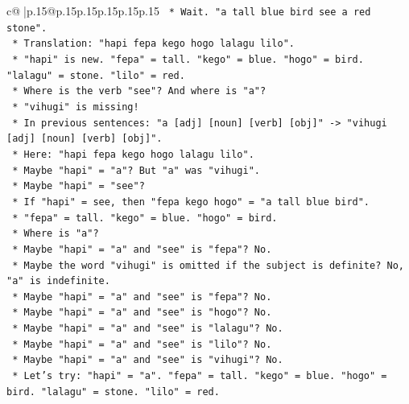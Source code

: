 \documentclass{article}
\begin{document}
{\begin{supertabular}{c@{$\;$}|p{.15\linewidth}@{}p{.15\linewidth}p{.15\linewidth}p{.15\linewidth}p{.15\linewidth}p{.15\linewidth}}
{{{\texttt{                        *   Wait. "a tall blue bird see a red stone".} \\
\texttt{                        *   Translation: "hapi fepa kego hogo lalagu lilo".} \\
\texttt{                        *   "hapi" is new. "fepa" = tall. "kego" = blue. "hogo" = bird. "lalagu" = stone. "lilo" = red.} \\
\texttt{                        *   Where is the verb "see"? And where is "a"?} \\
\texttt{                        *   "vihugi" is missing!} \\
\texttt{                        *   In previous sentences: "a {[}adj{]} {[}noun{]} {[}verb{]} {[}obj{]}" {-}> "vihugi {[}adj{]} {[}noun{]} {[}verb{]} {[}obj{]}".} \\
\texttt{                        *   Here: "hapi fepa kego hogo lalagu lilo".} \\
\texttt{                        *   Maybe "hapi" = "a"? But "a" was "vihugi".} \\
\texttt{                        *   Maybe "hapi" = "see"?} \\
\texttt{                        *   If "hapi" = see, then "fepa kego hogo" = "a tall blue bird".} \\
\texttt{                        *   "fepa" = tall. "kego" = blue. "hogo" = bird.} \\
\texttt{                        *   Where is "a"?} \\
\texttt{                        *   Maybe "hapi" = "a" and "see" is "fepa"? No.} \\
\texttt{                        *   Maybe the word "vihugi" is omitted if the subject is definite? No, "a" is indefinite.} \\
\texttt{                        *   Maybe "hapi" = "a" and "see" is "fepa"? No.} \\
\texttt{                        *   Maybe "hapi" = "a" and "see" is "hogo"? No.} \\
\texttt{                        *   Maybe "hapi" = "a" and "see" is "lalagu"? No.} \\
\texttt{                        *   Maybe "hapi" = "a" and "see" is "lilo"? No.} \\
\texttt{                        *   Maybe "hapi" = "a" and "see" is "vihugi"? No.} \\
\texttt{                        *   Let's try: "hapi" = "a". "fepa" = tall. "kego" = blue. "hogo" = bird. "lalagu" = stone. "lilo" = red.} \\
}}}
\end{supertabular}}
\end{document}
